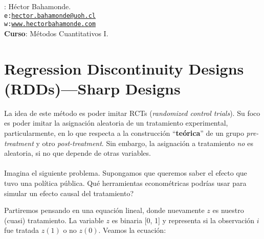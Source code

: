 \documentclass[10pt]{article}
\begin{document}


\thispagestyle{fancy} %





\hspace{-5mm}{\bf Profesor}: H\'ector Bahamonde.\\
\texttt{e:}\href{mailto:hector.bahamonde@uoh.cl}{\texttt{hector.bahamonde@uoh.cl}}\\
\texttt{w:}\href{http://www.hectorbahamonde.com}{\texttt{www.hectorbahamonde.com}}\\
{\bf Curso}: M\'etodos Cuantitativos I.

\section*{Regression Discontinuity Designs (RDDs)---Sharp Designs}

La idea de este m\'etodo es poder imitar RCTs (\emph{randomized control trials}). Su foco es poder imitar la asignaci\'on aleatoria de un tratamiento experimental, particularmente, en lo que respecta a la construcci\'on ``{\bf te\'orica}'' de un grupo \emph{pre-treatment} y otro \emph{post-treatment}. Sin embargo, la asignaci\'on a tratamiento \emph{no} es aleatoria, si no que depende de otras variables.
\\
\\
Imagina el siguiente problema. Supongamos que queremos saber el efecto que tuvo una pol\'itica p\'ublica. Qu\'e herramientas econom\'etricas podr\'ias usar para simular un efecto causal del tratamiento?

Partiremos pensando en una equaci\'on lineal, donde nuevamente $z$ es nuestro (cuasi) tratamiento. La variable $z$ es binaria [0, 1] y representa si la observaci\'on $i$ fue tratada $z(1)$ o no $z(0)$. Veamos la ecuaci\'on:
\end{document}
